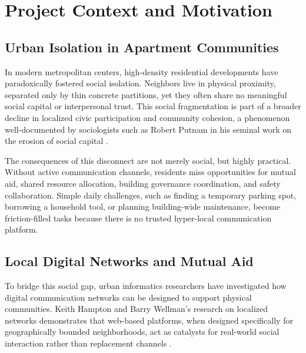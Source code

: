 \chapter{Project Context and Motivation}
\label{chap:project-context-motivation}

\section{Urban Isolation in Apartment Communities}
In modern metropolitan centers, high-density residential developments have paradoxically fostered social isolation. Neighbors live in physical proximity, separated only by thin concrete partitions, yet they often share no meaningful social capital or interpersonal trust. This social fragmentation is part of a broader decline in localized civic participation and community cohesion, a phenomenon well-documented by sociologists such as Robert Putnam in his seminal work on the erosion of social capital \cite{putnam2000bowling}. 

The consequences of this disconnect are not merely social, but highly practical. Without active communication channels, residents miss opportunities for mutual aid, shared resource allocation, building governance coordination, and safety collaboration. Simple daily challenges, such as finding a temporary parking spot, borrowing a household tool, or planning building-wide maintenance, become friction-filled tasks because there is no trusted hyper-local communication platform.

\section{Local Digital Networks and Mutual Aid}
To bridge this social gap, urban informatics researchers have investigated how digital communication networks can be designed to support physical communities. Keith Hampton and Barry Wellman's research on localized networks demonstrates that web-based platforms, when designed specifically for geographically bounded neighborhoods, act as catalysts for real-world social interaction rather than replacement channels \cite{hampton2003neighboring}.

